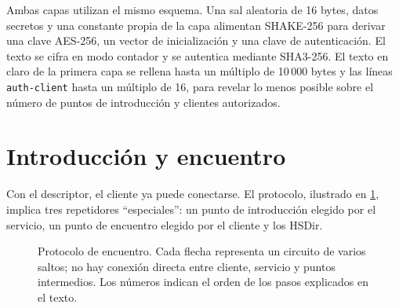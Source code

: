 Ambas capas utilizan el mismo esquema. Una sal aleatoria de 16 bytes, datos secretos y una constante propia de la capa alimentan SHAKE-256 para derivar una clave AES-256, un vector de inicialización y una clave de autenticación. El texto se cifra en modo contador y se autentica mediante SHA3-256. El texto en claro de la primera capa se rellena hasta un múltiplo de 10\,000 bytes y las líneas \texttt{auth-client} hasta un múltiplo de 16, para revelar lo menos posible sobre el número de puntos de introducción y clientes autorizados.

\section{Introducción y encuentro}\label{sec:os-rendezvous}

Con el descriptor, el cliente ya puede conectarse. El protocolo, ilustrado en \cref{fig:os-rendezvous}, implica tres repetidores \enquote{especiales}: un punto de introducción elegido por el servicio, un punto de encuentro elegido por el cliente y los HSDir.

\begin{figure}[htbp]
\centering

\caption{Protocolo de encuentro. Cada flecha representa un circuito de varios saltos; no hay conexión directa entre cliente, servicio y puntos intermedios. Los números indican el orden de los pasos explicados en el texto.}
\label{fig:os-rendezvous}
\end{figure}

